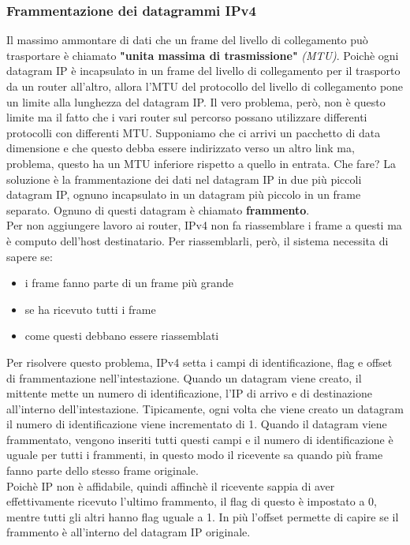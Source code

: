 \documentclass[11pt,a4paper]{article}
\begin{document}
\subsubsection{Frammentazione dei datagrammi IPv4} \label{par: MTU}
Il massimo ammontare di dati che un frame del livello di collegamento può trasportare è chiamato \textbf{"unita massima di trasmissione"} \textit{(MTU)}. Poichè ogni datagram IP è incapsulato in un frame del livello di collegamento per il trasporto da un router all'altro, allora l'MTU del protocollo del livello di collegamento pone un limite alla lunghezza del datagram IP. Il vero problema, però, non è questo limite ma il fatto che i vari router sul percorso possano utilizzare differenti protocolli con differenti MTU. Supponiamo che ci arrivi un pacchetto di data dimensione e che questo debba essere indirizzato verso un altro link ma, problema, questo ha un MTU inferiore rispetto a quello in entrata. Che fare? La soluzione è la frammentazione dei dati nel datagram IP in due più piccoli datagram IP, ognuno incapsulato in un datagram più piccolo in un frame separato. Ognuno di questi datagram è chiamato \textbf{frammento}. \\
Per non aggiungere lavoro ai router, IPv4 non fa riassemblare i frame a questi ma è computo dell'host destinatario. Per riassemblarli, però, il sistema necessita di sapere se:
\begin{itemize}
	\item i frame fanno parte di un frame più grande
	\item se ha ricevuto tutti i frame
	\item come questi debbano essere riassemblati
\end{itemize} 
Per risolvere questo problema, IPv4 setta i campi di identificazione, flag e offset di frammentazione nell'intestazione. Quando un datagram viene creato, il mittente mette un numero di identificazione, l'IP di arrivo e di destinazione all'interno dell'intestazione. Tipicamente, ogni volta che viene creato un datagram il numero di identificazione viene incrementato di 1. Quando il datagram viene frammentato, vengono inseriti tutti questi campi e il numero di identificazione è uguale per tutti i frammenti, in questo modo il ricevente sa quando più frame fanno parte dello stesso frame originale. \\
Poichè IP non è affidabile, quindi affinchè il ricevente sappia di aver effettivamente ricevuto l'ultimo frammento, il flag di questo è impostato a 0, mentre tutti gli altri hanno flag uguale a 1. In più l'offset permette di capire se il frammento è all'interno del datagram IP originale. \\
\end{document}
